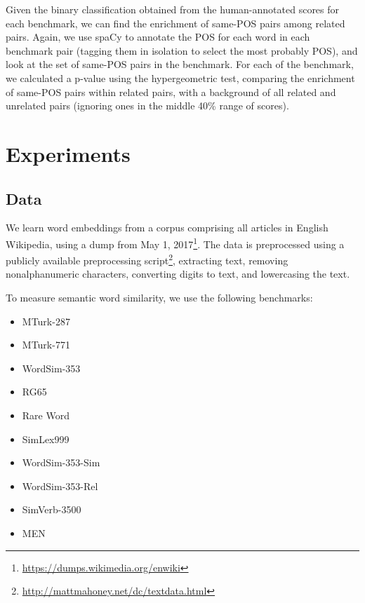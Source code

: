\documentclass[11pt,a4paper]{article}
\begin{document}
    Given the binary classification obtained from the human-annotated scores
    for each benchmark, we can find the enrichment of same-POS pairs among
    related pairs.
    Again, we use spaCy to annotate the POS for each word in each benchmark
    pair (tagging them in isolation to select the most probably POS),
    and look at the set of same-POS pairs in the benchmark.
    For each of the benchmark, we calculated a p-value using the hypergeometric
    test, comparing the enrichment of same-POS pairs within related pairs,
    with a background of all related and unrelated pairs (ignoring ones in
    the middle 40\% range of scores).
    
    
    \section{Experiments}\label{sec:exp}
    
    \subsection{Data}\label{sec:data}
    We learn word embeddings from a corpus comprising all articles in English Wikipedia,
    using a dump from May 1, 2017\footnote{\url{https://dumps.wikimedia.org/enwiki}}.
    The data is preprocessed using a publicly available preprocessing
    script\footnote{\url{http://mattmahoney.net/dc/textdata.html}},
    extracting text, removing nonalphanumeric characters,
    converting digits to text, and lowercasing the text.
    
    To measure semantic word similarity, we use the following benchmarks:
    \begin{itemize}
        \item MTurk-287~\cite{radinsky2011word}
        \item MTurk-771~\cite{halawi2012large}
        \item WordSim-353~\cite{finkelstein2001placing}
        \item RG65~\cite{rubenstein1965contextual}
        \item Rare Word~\cite{luong2013better}
        \item SimLex999~\cite{hill2015simlex}
        \item WordSim-353-Sim~\cite{agirre2009study}
        \item WordSim-353-Rel~\cite{zesch2008using}
        \item SimVerb-3500~\cite{Gerz2016emnlp}
        \item MEN~\cite{bruni2012distributional}
    \end{itemize}
    
\end{document}
